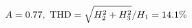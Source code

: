 \documentclass[preview]{standalone}
\begin{document}
\begin{align*}
\special{dvisvgm:raw <g id='unique000'>}A=0.77,\ \text{THD}=\sqrt{H_2^2+H_3^2}/H_1=14.1\%\special{dvisvgm:raw </g>}
\end{align*}
\end{document}
